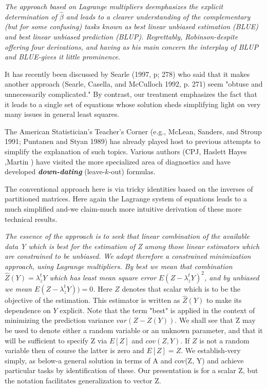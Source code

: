\documentclass[Main.tex]{subfiles}
\begin{document}
\emph{The approach based on Lagrange multipliers deemphasizes the explicit determination of $\hat{\beta}$ and leads to a clearer understanding of the complementary (but for some confusing) tasks known as best linear unbiased estimation (BLUE) and best linear unbiased prediction (BLUP). Regrettably, Robinson-despite offering four derivations, and having as his main concern the interplay of BLUP and BLUE-gives it little prominence.}

It has recently been discussed by Searle (1997, p; 278) who said that it makes another approach (Searle, Casella, and McCulloch 1992, p. 271) seem "obtuse and unnecessarily complicated." By contrast, our treatment emphasizes the fact that it leads to a single set of equations whose solution sheds simplifying light on very many issues in general least squares.

The American Statistician's Teacher's Corner (e.g., McLean, Sanders, and Stroup 1991; Puntanen and Styan 1989) has already played host to previous attempts to simplify the explanation of such topics. Various authors (CPJ, Haslett Hayes ,Martin ) have visited the more specialized area of diagnostics and have developed \textbf{\emph{down-dating}} (leave-$k$-out) formulas.

The conventional approach here is via tricky identities based on the inverses of partitioned matrices. Here again the Lagrange system of equations leads to a much simplified and-we claim-much more intuitive derivation of these more technical results.


\emph{
	The essence of the approach is to seek that linear combination of the available data Y which is best for the
	estimation of Z among those linear estimators which are constrained to be unbiased. We adopt therefore a constrained minimization approach, using Lagrange multipliers. By best we mean that combination $\hat{Z}(Y) = \lambda_{z}^{t}Y$ which has least mean square error $E( Z- \lambda_{z}^{t}Y)^2$, and by unbiased we mean $E( Z- \lambda_{z}^{t}Y)) = 0$. }
Here $Z$ denotes that scalar which is to be the objective of the estimation. This estimator is written as $\hat{Z}(Y)$ to make its dependence on $Y$ explicit. Note that the term "best" is applied in the context of minimizing the prediction variance $var(Z - Z(Y))$. We shall see that Z may be used to denote either a random variable or an unknown parameter, and that it will be sufficient to specify Z via $E[Z]$ and $cov(Z, Y)$. If $Z$ is not a random variable then of course the latter is zero and $E[Z] = Z$. We establish-very simply, as below-a general solution in terms of A and cov(Z, Y) and achieve particular tasks by identification of these. Our presentation is for a scalar Z, but the notation facilitates generalization to vector Z.
\end{document}
